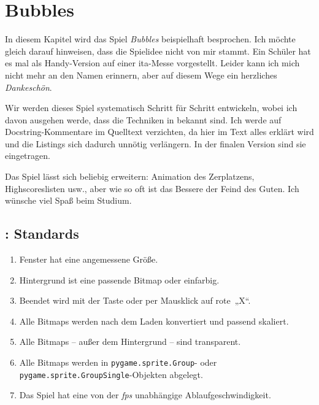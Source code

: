 \newpage
\section{Bubbles}

In diesem Kapitel wird das Spiel \emph{Bubbles} beispielhaft besprochen. Ich möchte gleich darauf hinweisen, dass die Spielidee nicht von mir stammt. Ein Schüler hat es mal als Handy-Version auf einer \Gls{ita}-Messe vorgestellt. Leider kann ich mich nicht mehr an den Namen erinnern, aber auf diesem Wege ein herzliches \emph{Dankeschön}. 

Wir werden dieses Spiel systematisch Schritt für Schritt entwickeln, wobei ich davon ausgehen werde, dass die Techniken in  bekannt sind. Ich werde auf Docstring-Kommentare im Quelltext verzichten, da hier im Text alles erklärt wird und die Listings sich dadurch unnötig verlängern. In der finalen Version sind sie eingetragen.

Das Spiel lässt sich beliebig erweitern: Animation des Zerplatzens, Highscoreslisten usw., aber wie so oft ist das Bessere der Feind des Guten. Ich wünsche viel Spaß beim Studium.


\subsection{: Standards}

\begin{enumerate}
    \item Fenster hat eine angemessene Größe.\label{reqStandardGröße}
    \item Hintergrund ist eine passende Bitmap oder einfarbig.\label{reqStandardHintergrund}
    \item Beendet wird mit der Taste \keys{\esc} oder per Mausklick auf rote~„X“.\label{reqStandardBeenden}
    \item Alle Bitmaps werden nach dem Laden konvertiert und passend skaliert.\label{reqStandardSprite}
    \item Alle Bitmaps -- außer dem Hintergrund -- sind transparent.\label{reqStandardTransparenz}
    \item Alle Bitmaps werden in \texttt{pygame.sprite.Group}- oder \texttt{py\-game\-.sprite\-.Group\-Single}-Objekten abgelegt.\label{reqStandardGruppe}
    \item Das Spiel hat eine von der \emph{fps} unabhängige Ablaufgeschwindigkeit.\label{reqStandardFps}
\end{enumerate}
\er


